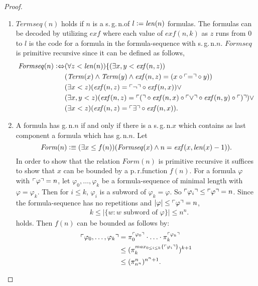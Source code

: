 \begin{proof}
\begin{enumerate}
\item $\mathit{Termseq}(n)$ holds if $n$ is a s.\,g.\,n.\@ of $l \vcentcolon= \mathit{len}(n)$ formulas. The formulas can be decoded by utilizing $\mathit{exf}$ where each value of $\mathit{exf}(n,k)$ as $z$ runs from $0$ to $l$ is the code for a formula in the formula-sequence with s.\,g.\,n.\@ $n$. $\mathit{Formseq}$ is primitive recursive since it can be defined as follows,
\begin{align*}
\mathit{Formseq}(n)  \vcentcolon \Leftrightarrow & ( \forall z < \mathit{len}(n)) \lbrace  (\exists x,y < \mathit{exf}(n,z) )\\
&   ( \mathit{Term}(x) \wedge \mathit{Term}(y) \wedge \mathit{exf}(n,z) = (x \circ \ulcorner = \urcorner \circ y ) )\\
& (\exists x < z )  (\mathit{exf}(n,z) = \ulcorner \lnot \urcorner \circ \mathit{exf}(n,x))  \vee \\
& (\exists x, y < z ) (\mathit{exf}(n,z) = \ulcorner ( \urcorner \circ \mathit{exf}(n,x) \circ \ulcorner \vee \urcorner \circ \mathit{exf}(n,y) \circ \ulcorner ) \urcorner )   \vee \\
& (\exists  x< z )  (\mathit{exf}(n,z) = \ulcorner \exists \urcorner \circ \mathit{exf}(n,x)).\\
\end{align*} 
\item A formula has g.\,n.\@ $n$ if and only if there is a s.\,g.\,n.\@ $x$ which contains as last component a formula which has g.\,n.\@ $n$. Let
\[
\mathit{Form}(n) \vcentcolon \equiv ( \exists x \le f(n))(\mathit{Formseq}(x) \wedge n = \mathit{exf}(x, \mathit{len}(x)-1)).
\]
In order to show that the relation $\mathit{Form}(n)$ is primitive recursive it suffices to show that $x$ can be bounded by a p.\,r.\@ function $f(n)$. For a formula $\varphi$ with $\ulcorner \varphi \urcorner =n$, let $\varphi_0, \ldots, \varphi_k$ be a formula-sequence of minimal length with $\varphi= \varphi_k$. Then for $i \le k$, $\varphi_i$ is a subword of $\varphi_k = \varphi$. So $\ulcorner \varphi_i \urcorner \le \ulcorner \varphi \urcorner = n$. Since the formula-sequence has no repetitions and
 $|\varphi| \le \ulcorner \varphi \urcorner = n$,
\begin{align*}
&k \le |\lbrace w : w \text{ subword of }\varphi \rbrace | \le n^n.
\end{align*}
holds. Then $f(n)$ can be bounded as follows by:
\begin{align*}
 \ulcorner \varphi_0, \ldots, \varphi_k \urcorner &= \pi_0^{\ulcorner \varphi_0 \urcorner} \cdot \ldots \cdot \pi_k^{\ulcorner \varphi_k \urcorner} \\
 & \le (\pi_k^{max_{0 \le i \le k} \lbrace \ulcorner \varphi_i \urcorner \rbrace})^{k+1} \\
 & \le (\pi_{n^n}^n)^{n^n+1}.
\end{align*} 


\end{enumerate}
\end{proof}
